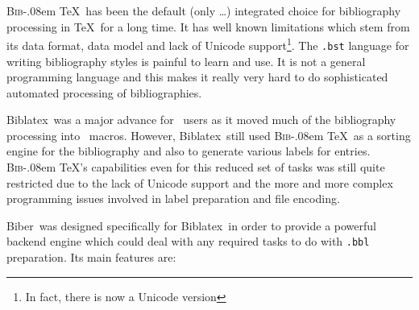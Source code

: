 \documentclass{ltxdockit}
\def\BibTeX{\textsc{Bib}\kern-.08em \TeX}
\newcommand*{\biber}{Biber\xspace}
\newcommand*{\biblatex}{Biblatex\xspace}
\begin{document}
\BibTeX\ has been the default (only \ldots) integrated choice for
bibliography processing in \TeX\ for a long time. It has well known
limitations which stem from its data format, data model and lack of Unicode
support\footnote{In fact, there is now a Unicode version}. The
\verb+.bst+ language for writing bibliography styles is painful to learn
and use. It is not a general programming language and this makes it really
very hard to do sophisticated automated processing of bibliographies.

\biblatex\ was a major advance for \latex\ users as it moved much
of the bibliography processing into \latex\ macros. However,
\biblatex\ still used \BibTeX\ as a sorting engine for the
bibliography and also to generate various labels for
entries. \BibTeX's capabilities even for this reduced set of
tasks was still quite restricted due to the lack of Unicode support and
the more and more complex programming issues involved in label
preparation and file encoding.

\biber\ was designed specifically for \biblatex\ in order to
provide a powerful backend engine which could deal with any required
tasks to do with \verb+.bbl+ preparation. Its main features are:
\end{document}
